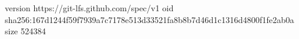 version https://git-lfs.github.com/spec/v1
oid sha256:167d1244f59f7939a7c7178e513d33521fa8b8b7d46d1c1316d4800f1fe2ab0a
size 524384
